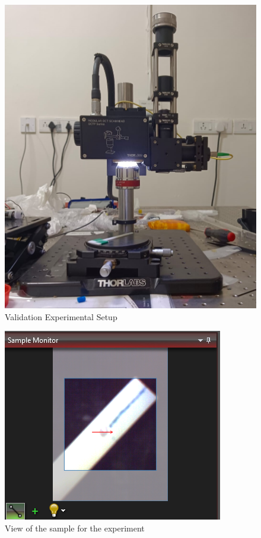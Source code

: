 
\begin{figure}[H]\label{fig4.3}
\centering \includegraphics[scale=0.2]{Images/ExptSetup.jpg}
\caption{Validation Experimental Setup}
\end{figure}

\begin{figure}[H]\label{fig4.4}
\centering \includegraphics[scale=0.5]{Images/ScanPattern_ThorImage2.PNG}
\caption{View of the sample for the experiment}
\end{figure}

